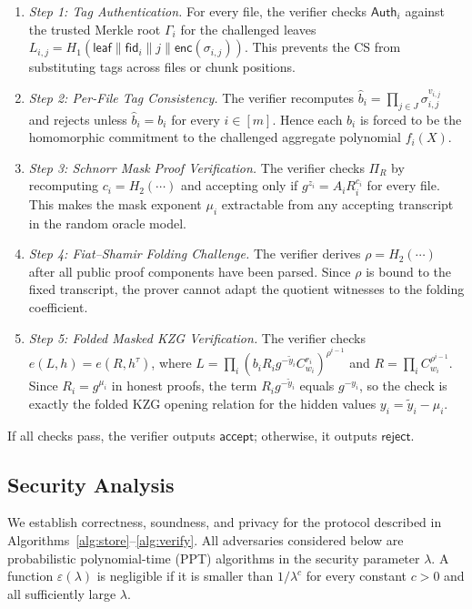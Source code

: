 \documentclass[lettersize,journal]{IEEEtran}
\begin{document}
\begin{enumerate}
    \item \textit{Step 1: Tag Authentication.} For every file, the verifier checks $\mathsf{Auth}_i$ against the trusted Merkle root $\Gamma_i$ for the challenged leaves $L_{i,j}=H_1(\mathsf{leaf}\|\mathsf{fid}_i\|j\|\mathsf{enc}(\sigma_{i,j}))$. This prevents the CS from substituting tags across files or chunk positions.
    \item \textit{Step 2: Per-File Tag Consistency.} The verifier recomputes
    $
    \hat{b}_i=\prod_{j\in J}\sigma_{i,j}^{v_{i,j}}
    $
    and rejects unless $\hat{b}_i=b_i$ for every $i\in[m]$. Hence each $b_i$ is forced to be the homomorphic commitment to the challenged aggregate polynomial $f_i(X)$.
    \item \textit{Step 3: Schnorr Mask Proof Verification.} The verifier checks $\Pi_R$ by recomputing $c_i=H_2(\cdots)$ and accepting only if $g^{z_i}=A_iR_i^{c_i}$ for every file. This makes the mask exponent $\mu_i$ extractable from any accepting transcript in the random oracle model.
    \item \textit{Step 4: Fiat--Shamir Folding Challenge.} The verifier derives
    $
    \rho=H_2(\cdots)
    $
    after all public proof components have been parsed. Since $\rho$ is bound to the fixed transcript, the prover cannot adapt the quotient witnesses to the folding coefficient.
    \item \textit{Step 5: Folded Masked KZG Verification.} The verifier checks $e(L,h)=e(R,h^\tau)$, where $L=\prod_i(b_iR_i g^{-\tilde{y}_i}C_{w_i}^{r_i})^{\rho^{i-1}}$ and $R=\prod_i C_{w_i}^{\rho^{i-1}}$. Since $R_i=g^{\mu_i}$ in honest proofs, the term $R_i g^{-\tilde{y}_i}$ equals $g^{-y_i}$, so the check is exactly the folded KZG opening relation for the hidden values $y_i=\tilde{y}_i-\mu_i$.
\end{enumerate}
If all checks pass, the verifier outputs $\mathsf{accept}$; otherwise, it outputs $\mathsf{reject}$.







\subsection{Security Analysis}
We establish correctness, soundness, and privacy for the protocol described in Algorithms~\ref{alg:store}--\ref{alg:verify}. All adversaries considered below are probabilistic polynomial-time (PPT) algorithms in the security parameter $\lambda$. A function $\varepsilon(\lambda)$ is negligible if it is smaller than $1/\lambda^c$ for every constant $c>0$ and all sufficiently large $\lambda$. 
\end{document}
